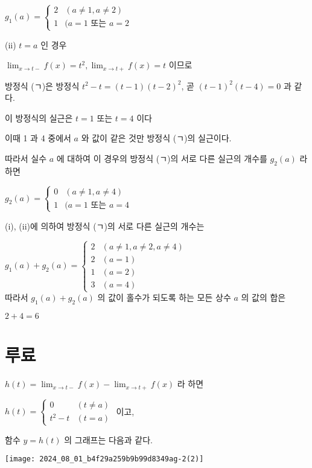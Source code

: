 \documentclass[10pt]{article}
\begin{document}
$g_{1}(a)= \begin{cases}2 & (a \neq 1, a \neq 2) \\ 1 & (a=1 \text { 또는 } a=2\end{cases}$

(ii) $t=a$ 인 경우

$\lim _{x \rightarrow t-} f(x)=t^{2}, \lim _{x \rightarrow t+} f(x)=t$ 이므로

방정식 (ㄱ)은 방정식 $t^{2}-t=(t-1)(t-2)^{2}$, 곧 $(t-1)^{2}(t-4)=0$ 과 같다.

이 방정식의 실근은 $t=1$ 또는 $t=4$ 이다

이때 1 과 4 중에서 $a$ 와 값이 같은 것만 방정식 (ㄱ)의 실근이다.

따라서 실수 $a$ 에 대하여 이 경우의 방정식 (ㄱ)의 서로 다른 실근의 개수를 $g_{2}(a)$ 라 하면

$g_{2}(a)= \begin{cases}0 & (a \neq 1, a \neq 4) \\ 1 & (a=1 \text { 또는 } a=4\end{cases}$

(i), (ii)에 의하여 방정식 (ㄱ)의 서로 다른 실근의 개수는

$g_{1}(a)+g_{2}(a)= \begin{cases}2 & (a \neq 1, a \neq 2, a \neq 4) \\ 2 & (a=1) \\ 1 & (a=2) \\ 3 & (a=4)\end{cases}$\\
따라서 $g_{1}(a)+g_{2}(a)$ 의 값이 홀수가 되도록 하는 모든 상수 $a$ 의 값의 합은

$2+4=6$

\section*{루료}
$h(t)=\lim _{x \rightarrow t-} f(x)-\lim _{x \rightarrow t+} f(x)$ 라 하면

$h(t)=\left\{\begin{array}{ll}0 & (t \neq a) \\ t^{2}-t & (t=a)\end{array}\right.$ 이고,

함수 $y=h(t)$ 의 그래프는 다음과 같다.

\begin{center}
\texttt{[image: 2024\_08\_01\_b4f29a259b9b99d8349ag-2(2)]}
\end{center}
\end{document}
